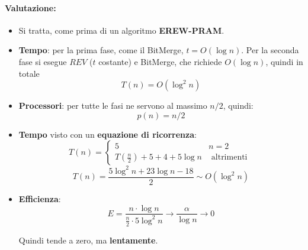 \documentclass[11pt]{article}
\begin{document}
	\paragraph{Valutazione: }
	\begin{itemize}
		\item Si tratta, come prima di un algoritmo \textbf{EREW-PRAM}.\\
		
		\item \textbf{Tempo}: per la prima fase, come il BitMerge, $t = O(\log n)$. Per la seconda fase si esegue $REV$ ($t$ costante) e BitMerge, che richiede $O(\log n)$, quindi in totale
		$$ T(n) = O (\log^2 n) $$
		\nn
		
		\item \textbf{Processori}: per tutte le fasi ne servono al massimo $n/2$, quindi:
		$$ p(n) = n/2 $$
		\nn
		
		\item \textbf{Tempo} visto con un \textbf{equazione di ricorrenza}: 
		$$ T(n) = \begin{cases}
			5 & n = 2 \\
			T(\frac{n}{2}) + 5 + 4 + 5 \log n& \text{ altrimenti }
		\end{cases}
		$$
		$$ T(n) = \frac{5 \log^2 n + 23 \log n - 18}{2} \sim O (\log^2 n) $$
		\nn
		
		\item \textbf{Efficienza}:
		$$ E = \frac{n \cdot  \log n}{\frac{n}{2} \cdot 5 \log^2 n} \rightarrow \frac{\alpha}{\log n} \rightarrow 0 $$
		
		Quindi tende a zero, ma \textbf{lentamente}.\\
	\end{itemize}
	
	
	
	
\end{document}
